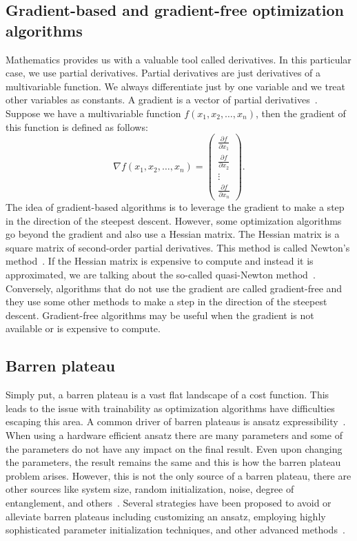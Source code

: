 \subsection{Gradient-based and gradient-free optimization algorithms}
Mathematics provides us with a valuable tool called derivatives. In this particular case, we use partial derivatives. Partial derivatives are just derivatives of a multivariable function. We always differentiate just by one variable and we treat other variables as constants. A gradient is a vector of partial derivatives~\cite{mmp}. Suppose we have a multivariable function $f(x_1, x_2, \ldots, x_n)$, then the gradient of this function is defined as follows:
\begin{equation}
    \nabla f(x_1, x_2, \ldots, x_n) =  \begin{pmatrix} \frac{\partial f}{\partial x_1} \\ \frac{\partial f}{\partial x_2} \\ \vdots \\ \frac{\partial f}{\partial x_n}\end{pmatrix} \text{.}
\end{equation}
The idea of gradient-based algorithms is to leverage the gradient to make a step in the direction of the steepest descent. However, some optimization algorithms go beyond the gradient and also use a Hessian matrix. The Hessian matrix is a square matrix of second-order partial derivatives. This method is called Newton's method~\cite{newton}. If the Hessian matrix is expensive to compute and instead it is approximated, we are talking about the so-called quasi-Newton method~\cite{quasi-newton}. Conversely, algorithms that do not use the gradient are called gradient-free and they use some other methods to make a step in the direction of the steepest descent. Gradient-free algorithms may be useful when the gradient is not available or is expensive to compute.

\subsection{Barren plateau}
Simply put, a barren plateau is a vast flat landscape of a cost function. This leads to the issue with trainability as optimization algorithms have difficulties escaping this area. A common driver of barren plateaus is ansatz expressibility~\cite{holmes2022}. When using a hardware efficient ansatz there are many parameters and some of the parameters do not have any impact on the final result. Even upon changing the parameters, the result remains the same and this is how the barren plateau problem arises. However, this is not the only source of a barren plateau, there are other sources like system size, random initialization, noise, degree of entanglement, and others~\cite{vqe_method}.
Several strategies have been proposed to avoid or alleviate barren plateaus including customizing an ansatz, employing highly sophisticated parameter initialization techniques, and other advanced methods~\cite{vqe_method}.